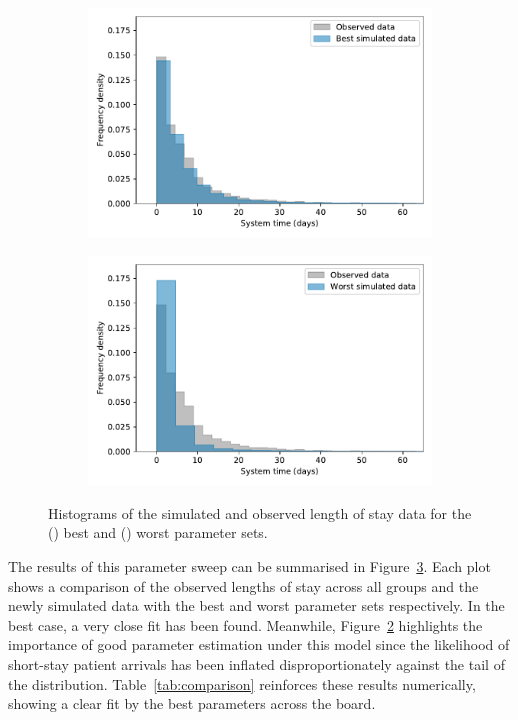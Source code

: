 \documentclass[11pt]{article}
\newlength{\imgwidth}
\begin{document}
\begin{figure}
    \centering%
    \begin{subfigure}{.5\imgwidth}
        \includegraphics[width=\linewidth]{img_best_params}
        \caption{}\label{fig:best_params}
    \end{subfigure}\hfill%
    \begin{subfigure}{.5\imgwidth}
        \includegraphics[width=\linewidth]{img_worst_params}
        \caption{}\label{fig:worst_params}
    \end{subfigure}
    \caption{Histograms of the simulated and observed length of stay data for
             the () best and ()
             worst parameter sets.}\label{fig:params}
\end{figure}

The results of this parameter sweep can be summarised in
Figure~\ref{fig:params}. Each plot shows a comparison of the observed lengths of
stay across all groups and the newly simulated data with the best and worst
parameter sets respectively. In the best case, a very close fit has been
found.  Meanwhile, Figure~\ref{fig:worst_params} highlights the importance of
good parameter estimation under this model since the likelihood of short-stay
patient arrivals has been inflated disproportionately against the tail of the
distribution. Table~\ref{tab:comparison} reinforces these results numerically,
showing a clear fit by the best parameters across the board.
\end{document}
